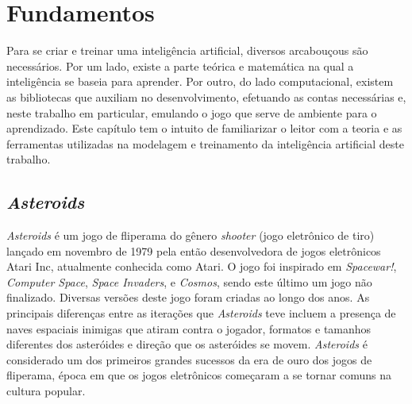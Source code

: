 \chapter{Fundamentos}
\label{cap:fundamentos}

Para se criar e treinar uma inteligência artificial, diversos arcabouçous são necessários. Por um lado, existe a parte teórica e matemática na qual a inteligência se baseia para aprender. Por outro, do lado computacional, existem as bibliotecas que auxiliam no desenvolvimento, efetuando as contas necessárias e, neste trabalho em particular, emulando o jogo que serve de ambiente para o aprendizado.
Este capítulo tem o intuito de familiarizar o leitor com a teoria e as ferramentas utilizadas na modelagem e treinamento da inteligência artificial deste trabalho.

\section{\textit{Asteroids}}
\label{sec:asteroids}

\textit{Asteroids} é um jogo de fliperama do gênero \textit{shooter} (jogo eletrônico de tiro) lançado em novembro de 1979 pela então desenvolvedora de jogos eletrônicos Atari Inc, atualmente conhecida como Atari. O jogo foi inspirado em \textit{Spacewar!}, \textit{Computer Space}, \textit{Space Invaders}, e \textit{Cosmos}, sendo este último um jogo não finalizado.
Diversas versões deste jogo foram criadas ao longo dos anos. As principais diferenças entre as iterações que \textit{Asteroids} teve incluem a presença de naves espaciais inimigas que atiram contra o jogador, formatos e tamanhos diferentes dos asteróides e direção que os asteróides se movem.
\textit{Asteroids} é considerado um dos primeiros grandes sucessos da era de ouro dos jogos de fliperama, época em que os jogos eletrônicos começaram a se tornar comuns na cultura popular. 

